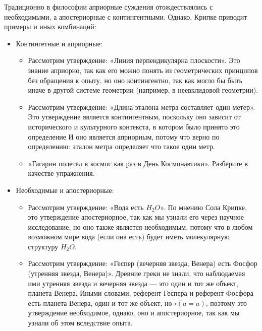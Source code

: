 \documentclass[openany]{book}
\theoremstyle{plain}
\theoremstyle{definition}
\begin{document}
Традиционно в философии априорные суждения отождествлялись с необходимыми, а апостериорные с контингентными.
Однако, Крипке приводит примеры и иных комбинаций:
\begin{itemize}
    \item Контингетные и априорные:
	\begin{itemize}
	    \item Рассмотрим утверждение: «Линия перпендикулярна плоскости». Это знание априорно, так как его можно понять из геометрических принципов без обращения к опыту, но оно контингентно, так как могло бы быть иначе в другой системе геометрии (например, в неевклидовой геометрии).
	    \item Рассмотрим утверждение: «Длина эталона метра составляет один метер». Это утверждение является контингентным, поскольку оно зависит от исторического и культурного контекста, в котором было принято это определение И оно является априорным, потому что верно по определению: эталон метра определяет что такое один метр.
	    \item «Гагарин полетел в космос как раз в День Космонавтики». Разберите в качестве упражнения.
	\end{itemize}
    \item Необходимые и апостериорные:
	\begin{itemize}
	    \item Рассмотрим утверждение: «Вода есть \(H_2 O\)». По мнению Сола Крипке, это утверждение апостериорное, так как мы узнали его через научное исследование, но оно также является необходимым, потому что в любом возможном мире вода (если она есть) будет иметь молекулярную структуру \(H_2 O\).
	    \item Рассмотрим утверждение: «Геспер (вечерняя звезда, Венера) есть Фосфор (утренняя звезда, Венера)». Древние греки не знали, что наблюдаемая ими утренняя звезда и вечерняя звезда — это один и тот же объект, планета Венера. Иными словами, референт Геспера и референт Фосфора есть планета Венера, один и тот же объект, но \(\square(a = a)\), поэтому это утверждение необходимое, однако, оно и апостериорное, так как мы узнали об этом вследствие опыта.
	\end{itemize}
\end{itemize}
\end{document}
